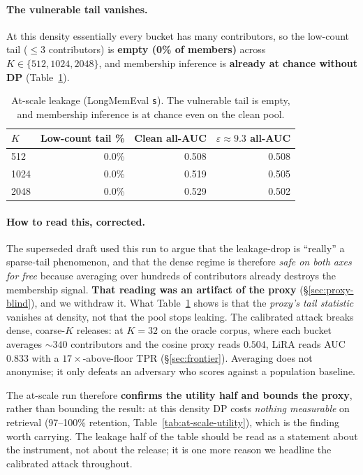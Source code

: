 \documentclass[pdflatex,sn-mathphys-num,iicol]{sn-jnl}
\theoremstyle{thmstyleone}%
\theoremstyle{thmstyletwo}%
\theoremstyle{thmstylethree}%
\newcommand{\eps}{\varepsilon}
\newcommand{\secref}[1]{\S\ref{#1}}
\begin{document}
\paragraph{The vulnerable tail vanishes.} At this density essentially every bucket has many
contributors, so the low-count tail ($\leq 3$ contributors) is \textbf{empty (0\% of members)}
across $K \in \{512, 1024, 2048\}$, and membership inference is \textbf{already at chance
without DP} (Table~\ref{tab:at-scale-leakage}).

\begin{table}[t]
  \centering
  \caption{At-scale leakage (LongMemEval \texttt{s}). The vulnerable tail is empty, and
  membership inference is at chance even on the clean pool.}
  \label{tab:at-scale-leakage}
  \begin{tabular}{@{}lrrr@{}}
    \toprule
    $K$ & Low-count tail \% & Clean all-AUC & $\eps \approx 9.3$ all-AUC \\
    \midrule
    512  & 0.0\% & 0.508 & 0.508 \\
    1024 & 0.0\% & 0.519 & 0.505 \\
    2048 & 0.0\% & 0.529 & 0.502 \\
    \bottomrule
  \end{tabular}
\end{table}

\paragraph{How to read this, corrected.} The superseded draft used this run to argue that the
leakage-drop is ``really'' a sparse-tail phenomenon, and that the dense regime is therefore
\emph{safe on both axes for free} because averaging over hundreds of contributors already destroys
the membership signal. \textbf{That reading was an artifact of the proxy}
(\secref{sec:proxy-blind}), and we withdraw it. What Table~\ref{tab:at-scale-leakage} shows is that
the \emph{proxy's tail statistic} vanishes at density, not that the pool stops leaking. The
calibrated attack breaks dense, coarse-$K$ releases: at $K = 32$ on the oracle corpus, where each
bucket averages ${\sim}340$ contributors and the cosine proxy reads $0.504$, LiRA reads AUC
$\mathbf{0.833}$ with a $17\times$-above-floor TPR (\secref{sec:frontier}). Averaging does not
anonymise; it only defeats an adversary who scores against a population baseline.

The at-scale run therefore \textbf{confirms the utility half and bounds the proxy}, rather than
bounding the result: at this density DP costs \emph{nothing measurable} on retrieval (97--100\%
retention, Table~\ref{tab:at-scale-utility}), which is the finding worth carrying. The leakage half
of the table should be read as a statement about the instrument, not about the release; it is
one more reason we headline the calibrated attack throughout.
\end{document}
